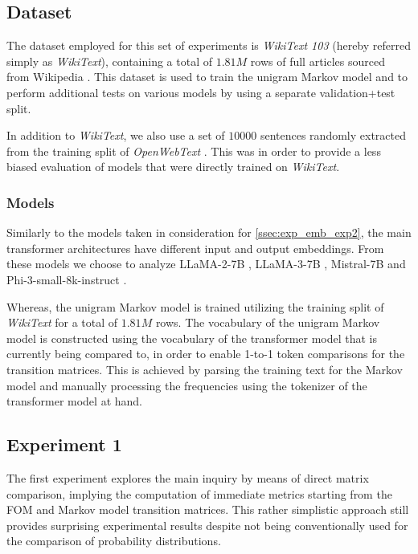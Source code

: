 
\subsection{Dataset}\label{ssec:exp_fom_dataset}

The dataset employed for this set of experiments is \emph{WikiText 103}  (hereby referred simply as \emph{WikiText}), containing a total of $1.81M$ rows of full articles sourced from Wikipedia .
This dataset is used to train the unigram Markov model and to perform additional tests on various models by using a separate validation+test split.

In addition to \emph{WikiText}, we also use a set of $10000$ sentences randomly extracted from the training split of \emph{OpenWebText} .
This was  in order to provide a less biased evaluation of models that were directly trained on \emph{WikiText}.

\subsubsection{Models}

Similarly to the models taken in consideration for \cref{ssec:exp_emb_exp2}, the main  transformer architectures have different input and output embeddings.
From these models we choose to analyze LLaMA-2-7B , LLaMA-3-7B , Mistral-7B  and Phi-3-small-8k-instruct .

Whereas, the unigram Markov model is trained utilizing the training split of \emph{WikiText} for a total of $1.81M$ rows.
The vocabulary of the unigram Markov model is constructed using the vocabulary of the transformer model that is currently being compared to, in order to enable 1-to-1 token comparisons for the transition matrices.
This is achieved by parsing the training text for the Markov model and manually processing the frequencies using the tokenizer of the transformer model at hand.

\subsection{Experiment 1}

The first experiment explores the main inquiry by means of direct matrix comparison, implying the computation of immediate metrics starting from the FOM and Markov model transition matrices.
This rather simplistic approach still provides surprising experimental results despite not being conventionally used for the comparison of probability distributions.

